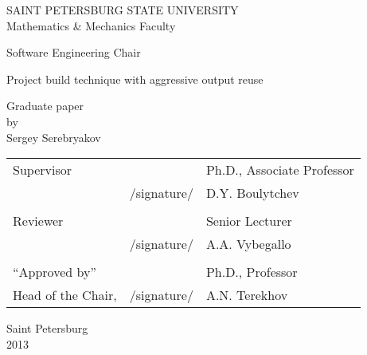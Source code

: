 %
%
\thispagestyle{empty}
\begin{center}
SAINT PETERSBURG STATE UNIVERSITY\\
Mathematics \& Mechanics Faculty\\
\end{center}

\begin{center}
Software Engineering Chair\\
\end{center}
\vspace{2cm}
\begin{center}
    \LARGE{Project build technique with aggressive output reuse} \\
\end{center}
\vspace{1cm}
\begin{center}
    \normalsize{Graduate paper} \\
	\normalsize{by} \\
    \large{Sergey Serebryakov}
\end{center}
\vspace{3cm}
\noindent
\begin{center}
    \small
    \begin{tabular}{lcl}
        Supervisor & \dotuline{\phantom{место для подписи}} & Ph.D., Associate Professor\\
        & /signature/ & D.Y. Boulytchev\\\\
        Reviewer & \dotuline{\phantom{место для подписи}} & Senior Lecturer\\
        & /signature/& A.A. Vybegallo\\\\
        ``Approved by'' & \dotuline{\phantom{место для подписи}} & Ph.D., Professor\\
        Head of the Chair, & /signature/& A.N. Terekhov\\
    \end{tabular}
\end{center}
\vspace{\fill}
\begin{center}
    \small
    Saint Petersburg\\2013
\end{center}
